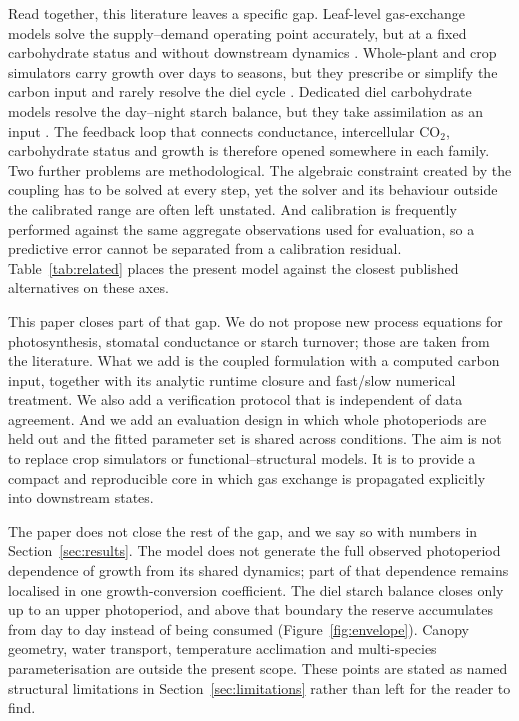 Read together, this literature leaves a specific gap. Leaf-level gas-exchange
models solve the supply--demand operating point accurately, but at a fixed
carbohydrate status and without downstream dynamics
\cite{Farquhar1980,Jarvis1976,vonCaemmerer2000}. Whole-plant and crop
simulators carry growth over days to seasons, but they prescribe or simplify
the carbon input and rarely resolve the diel cycle
\cite{Jones2003,deWit2019,Holzworth2014}. Dedicated diel carbohydrate models
resolve the day--night starch balance, but they take assimilation as an input
\cite{Scialdone2013,Graf2010}. The feedback loop that connects conductance,
intercellular CO$_2$, carbohydrate status and growth is therefore opened
somewhere in each family. Two further problems are methodological. The
algebraic constraint created by the coupling has to be solved at every step,
yet the solver and its behaviour outside the calibrated range are often left
unstated. And calibration is frequently performed against the same aggregate
observations used for evaluation, so a predictive error cannot be separated
from a calibration residual. Table~\ref{tab:related} places the present model
against the closest published alternatives on these axes.

This paper closes part of that gap. We do not propose new process equations for
photosynthesis, stomatal conductance or starch turnover; those are taken from
the literature. What we add is the coupled formulation with a computed carbon
input, together with its analytic runtime closure and fast/slow numerical
treatment. We also add a verification protocol that is independent of data
agreement. And we add an evaluation design in which whole photoperiods are held
out and the fitted parameter set is shared across conditions. The aim is not to replace crop simulators or
functional--structural models. It is to provide a compact and reproducible core
in which gas exchange is propagated explicitly into downstream states.

The paper does not close the rest of the gap, and we say so with numbers in
Section~\ref{sec:results}. The model does not generate the full observed
photoperiod dependence of growth from its shared dynamics; part of that
dependence remains localised in one growth-conversion coefficient. The diel
starch balance closes only up to an upper photoperiod, and above that boundary
the reserve accumulates from day to day instead of being consumed
(Figure~\ref{fig:envelope}). Canopy geometry, water transport, temperature
acclimation and multi-species parameterisation are outside the present scope.
These points are stated as named structural limitations in
Section~\ref{sec:limitations} rather than left for the reader to find.

